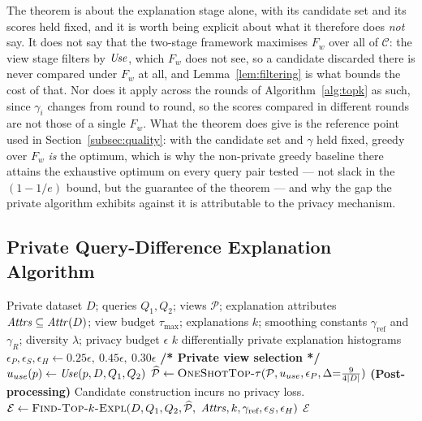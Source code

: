 
The theorem is about the explanation stage alone, with its candidate set and its scores held fixed, and it is worth being explicit about what it therefore does \emph{not} say.
It does not say that the two-stage framework maximises $F_w$ over all of $\mathcal{C}$: the view stage filters by $\mathit{Use}$, which $F_w$ does not see, so a candidate discarded there is never compared under $F_w$ at all, and Lemma~\ref{lem:filtering} is what bounds the cost of that.
Nor does it apply across the rounds of Algorithm~\ref{alg:topk} as such, since $\gamma_i$ changes from round to round, so the scores compared in different rounds are not those of a single $F_w$.
What the theorem does give is the reference point used in Section~\ref{subsec:quality}: with the candidate set and $\gamma$ held fixed, greedy over $F_w$ \emph{is} the optimum, which is why the non-private greedy baseline there attains the exhaustive optimum on every query pair tested --- not slack in the $(1-1/e)$ bound, but the guarantee of the theorem --- and why the gap the private algorithm exhibits against it is attributable to the privacy mechanism.

\subsection{Private Query-Difference Explanation Algorithm}
\label{subsec:private-algorithm}

\begin{algorithm}[t]
\caption{Private-Queries-Diff-Top-$k$-Explanation}
\label{alg:main}
\begin{algorithmic}[1]
\Require Private dataset $D$; queries $Q_1,Q_2$; views $\mathcal{P}$; explanation attributes $\mathit{Attrs}\subseteq\mathit{Attr}(D)$; view budget $\tau_{\max}$; explanations $k$; smoothing constants $\gamma_{\text{ref}}$ and $\gamma_R$; diversity $\lambda$; privacy budget $\epsilon$
\Ensure $k$ differentially private explanation histograms
\State $\epsilon_P,\epsilon_S,\epsilon_H \gets 0.25\epsilon,\ 0.45\epsilon,\ 0.30\epsilon$
\State \textbf{/* Private view selection */}
\State $u_{use}(p)\gets \mathit{Use}(p,D,Q_1,Q_2)$
\State $\widehat{\mathcal{P}}\gets \textsc{OneShotTop-}\tau(\mathcal{P},u_{use},\epsilon_P,\Delta{=}\tfrac{9}{4|D|})$
\Statex \textbf{(Post-processing)} Candidate construction incurs no privacy loss.
\State $\mathcal{E}\gets \textsc{Find-Top-$k$-Expl}(D,Q_1,Q_2,\widehat{\mathcal{P}},$
\Statex \hspace{\algorithmicindent}$\mathit{Attrs},k,\gamma_{\text{ref}},\epsilon_S,\epsilon_H)$
\State \Return $\mathcal{E}$
\end{algorithmic}
\end{algorithm}

